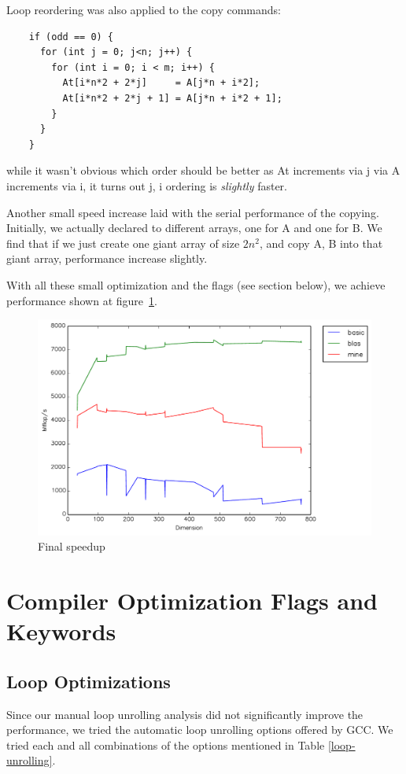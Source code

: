 \documentclass{article}
\begin{document}
    Loop reordering was also applied to the copy commands:
    \begin{lstlisting}
    if (odd == 0) {
      for (int j = 0; j<n; j++) {
        for (int i = 0; i < m; i++) {
          At[i*n*2 + 2*j]     = A[j*n + i*2];
          At[i*n*2 + 2*j + 1] = A[j*n + i*2 + 1];
        }
      }
    }
    \end{lstlisting}

    while it wasn't obvious which order should be better as At increments via j via A increments via i, it turns out j, i ordering is \emph{slightly} faster.

    Another small speed increase laid with the serial performance of the copying. Initially, we actually declared to different arrays, one for A and one for B.
    We find that if we just create one giant array of size $2n^2$, and copy A, B into that giant array, performance increase slightly.

    With all these small optimization and the flags (see section below), we achieve performance shown at figure~\ref{fig:final}.

    \begin{figure}[h]
      \centering
      \includegraphics[width=.7\textwidth]{final.pdf}
      \caption{Final speedup}
      \label{fig:final}
    \end{figure}

\section{Compiler Optimization Flags and Keywords}

\subsection{Loop Optimizations}

Since our manual loop unrolling analysis did not significantly improve the performance, we tried the automatic loop unrolling options offered by GCC. We tried each and all combinations of the options mentioned in Table \ref{loop-unrolling}. 
\end{document}
